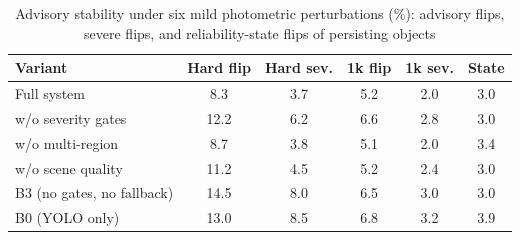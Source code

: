 \begin{table}[t]
\centering
\caption{Advisory stability under six mild photometric perturbations (\%): advisory flips, severe flips, and reliability-state flips of persisting objects}
\label{tab:stability}
\footnotesize
\setlength{\tabcolsep}{3pt}
\begin{tabular}{lccccc}
\hline
Variant & Hard flip & Hard sev. & 1k flip & 1k sev. & State \\
\hline
Full system & 8.3 & 3.7 & 5.2 & 2.0 & 3.0 \\
w/o severity gates & 12.2 & 6.2 & 6.6 & 2.8 & 3.0 \\
w/o multi-region & 8.7 & 3.8 & 5.1 & 2.0 & 3.4 \\
w/o scene quality & 11.2 & 4.5 & 5.2 & 2.4 & 3.0 \\
B3 (no gates, no fallback) & 14.5 & 8.0 & 6.5 & 3.0 & 3.0 \\
B0 (YOLO only) & 13.0 & 8.5 & 6.8 & 3.2 & 3.9 \\
\hline
\end{tabular}
\end{table}
